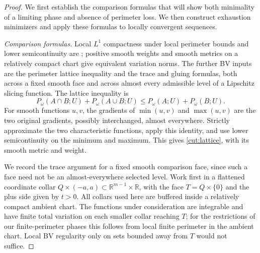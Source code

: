 \documentclass[11pt]{article}
\numberwithin{equation}{section}
\theoremstyle{definition}
\theoremstyle{remark}
\begin{document}
\begin{proof}
We first establish the comparison formulas that will show both
minimality of a limiting phase and absence of perimeter loss. We then
construct exhaustion minimizers and apply these formulas to locally
convergent sequences.

\emph{Comparison formulas.}
Local $L^1$ compactness under local perimeter bounds and lower
semicontinuity are \citet[Chapter~2, Theorem~2.6]{simonGMT}; positive
smooth weights and smooth metrics on a relatively compact chart give
equivalent variation norms. The further BV inputs are the perimeter
lattice inequality and the trace and gluing formulas, both across a
fixed smooth face and across almost every admissible level of a
Lipschitz slicing function. The lattice inequality is
\begin{equation}\label{cut:lattice}
 P_\omega(A\cap B;U)+P_\omega(A\cup B;U)
          \le P_\omega(A;U)+P_\omega(B;U).
\end{equation}
For smooth functions $u,v$, the gradients of $\min(u,v)$
and $\max(u,v)$ are the two original gradients, possibly interchanged,
almost everywhere.  Strictly approximate the two characteristic
functions, apply this identity, and use lower semicontinuity on the
minimum and maximum.  This gives \eqref{cut:lattice}, with its smooth
metric and weight.

We record the trace argument for a fixed smooth comparison face, since
such a face need not be an almost-everywhere selected level.
Work first in a flattened coordinate collar
$Q\times(-a,a)\subset\mathbb R^{m-1}\times\mathbb R$, with the face
$T=Q\times\{0\}$ and the plus side given by $t>0$.
All collars used here are buffered inside a relatively compact ambient
chart.  The functions under consideration are integrable and have
finite total variation on each smaller collar reaching $T$; for the
restrictions of our finite-perimeter phases this follows from local
finite perimeter in the ambient chart.  Local BV regularity only on
sets bounded away from $T$ would not suffice.


\end{proof}
\end{document}
